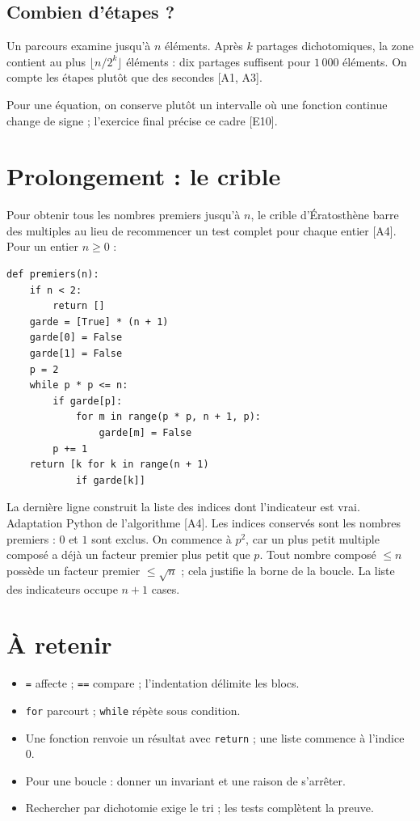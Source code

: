 \documentclass[11pt]{article}
\begin{document}
\subsection*{Combien d'étapes ?}
Un parcours examine jusqu'à $n$ éléments. Après $k$ partages dichotomiques, la zone contient au plus $\lfloor n/2^k\rfloor$ éléments : dix partages suffisent pour $1\,000$ éléments. On compte les étapes plutôt que des secondes [A1, A3].

Pour une équation, on conserve plutôt un intervalle où une fonction continue change de signe ; l'exercice final précise ce cadre [E10].

\section{Prolongement : le crible}\label{sec:crible}
Pour obtenir tous les nombres premiers jusqu'à $n$, le crible d'Ératosthène barre des multiples au lieu de recommencer un test complet pour chaque entier [A4]. Pour un entier $n\ge0$ :
\begin{verbatim}
def premiers(n):
    if n < 2:
        return []
    garde = [True] * (n + 1)
    garde[0] = False
    garde[1] = False
    p = 2
    while p * p <= n:
        if garde[p]:
            for m in range(p * p, n + 1, p):
                garde[m] = False
        p += 1
    return [k for k in range(n + 1)
            if garde[k]]
\end{verbatim}
La dernière ligne construit la liste des indices dont l'indicateur est vrai. Adaptation Python de l'algorithme [A4]. Les indices conservés sont les nombres premiers : $0$ et $1$ sont exclus. On commence à $p^2$, car un plus petit multiple composé a déjà un facteur premier plus petit que $p$. Tout nombre composé $\le n$ possède un facteur premier $\le\sqrt n$ ; cela justifie la borne de la boucle. La liste des indicateurs occupe $n+1$ cases.

\section{À retenir}\label{sec:retenir}
\begin{retenir}
\begin{itemize}
\item \texttt{=} affecte ; \texttt{==} compare ; l'indentation délimite les blocs.
\item \texttt{for} parcourt ; \texttt{while} répète sous condition.
\item Une fonction renvoie un résultat avec \texttt{return} ; une liste commence à l'indice $0$.
\item Pour une boucle : donner un invariant et une raison de s'arrêter.
\item Rechercher par dichotomie exige le tri ; les tests complètent la preuve.
\end{itemize}
\end{retenir}
\end{document}
